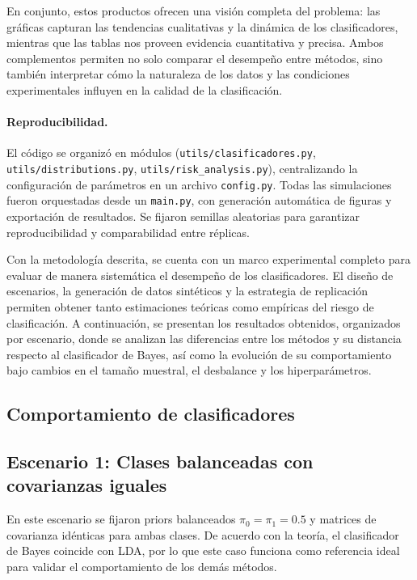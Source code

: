 \documentclass[10pt]{article}
\begin{document}
En conjunto, estos productos ofrecen una visión completa del problema: las gráficas capturan las tendencias cualitativas y la dinámica de los clasificadores, mientras que las tablas nos proveen evidencia cuantitativa y precisa. Ambos complementos permiten no solo comparar el desempeño entre métodos, sino también interpretar cómo la naturaleza de los datos y las condiciones experimentales influyen en la calidad de la clasificación.

\paragraph{Reproducibilidad.}
El código se organizó en módulos (\texttt{utils/clasificadores.py}, \texttt{utils/distributions.py}, \texttt{utils/risk\_analysis.py}), centralizando la configuración de parámetros en un archivo \texttt{config.py}. Todas las simulaciones fueron orquestadas desde un \texttt{main.py}, con generación automática de figuras y exportación de resultados. Se fijaron semillas aleatorias para garantizar reproducibilidad y comparabilidad entre réplicas.


\medskip


Con la metodología descrita, se cuenta con un marco experimental completo para evaluar de manera sistemática el desempeño de los clasificadores. El diseño de escenarios, la generación de datos sintéticos y la estrategia de replicación permiten obtener tanto estimaciones teóricas como empíricas del riesgo de clasificación. A continuación, se presentan los resultados obtenidos, organizados por escenario, donde se analizan las diferencias entre los métodos y su distancia respecto al clasificador de Bayes, así como la evolución de su comportamiento bajo cambios en el tamaño muestral, el desbalance y los hiperparámetros.


\subsection*{Comportamiento de clasificadores}

\subsection*{Escenario 1: Clases balanceadas con covarianzas iguales}

En este escenario se fijaron priors balanceados $\pi_0=\pi_1=0.5$ y matrices de covarianza idénticas para ambas clases. 
De acuerdo con la teoría, el clasificador de Bayes coincide con LDA, por lo que este caso funciona como referencia ideal 
para validar el comportamiento de los demás métodos.
\end{document}
